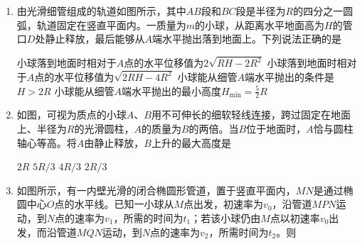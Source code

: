 
\begin{enumerate}[leftmargin=0em]
\renewcommand{\labelenumi}{\arabic{enumi}.}
\item
{}
由光滑细管组成的轨道如图所示，其中$ AB $段和$ BC $段是半径为$ R $的四分之一圆弧，轨道固定在竖直平面内。一质量为$ m $的小球，从距离水平地面高为$ H $的管口$ D $处静止释放，最后能够从$ A $端水平抛出落到地面上。下列说法正确的是  
\begin{figure}[h!]
\centering

\end{figure}

\fourchoices
{小球落到地面时相对于$ A $点的水平位移值为$2 \sqrt { R H - 2 R ^ { 2 } }$}
{小球落到地面时相对于$ A $点的水平位移值为$\sqrt { 2 R H - 4 R ^ { 2 } }$}
{小球能从细管$ A $端水平抛出的条件是$ H>2R $}
{小球能从细管$ A $端水平抛出的最小高度$H _ { \min } = \frac { 5 } { 2 } R$}




\item 
{}
如图，可视为质点的小球$ A $、$ B $用不可伸长的细软轻线连接，跨过固定在地面上、半径为$ R $的光滑圆柱，$ A $的质量为$ B $的两倍。当$ B $位于地面时，$ A $恰与圆柱轴心等高。将$ A $由静止释放，$ B $上升的最大高度是  
\begin{figure}[h!]
\centering

\end{figure}


\fourchoices
{$ 2R $}
{$ 5R/3 $}
{$ 4R/3 $ }
{$ 2R/3 $}





\item
{}
如图所示，有一内壁光滑的闭合椭圆形管道，置于竖直平面内，$ MN $是通过椭圆中心$ O $点的水平线。已知一小球从$ M $点出发，初速率为$ v_{0} $，沿管道$ MPN $运动，到$ N $点的速率为$ v_{1} $，所需的时间为$ t_{1} $；若该小球仍由$ M $点以初速率$ v_{0} $出发，而沿管道$ MQN $运动，到$ N $点的速率为$ v_{2} $，所需时间为$ t_{2} $。则  
\begin{figure}[h!]
\centering

\end{figure}


\end{enumerate}
